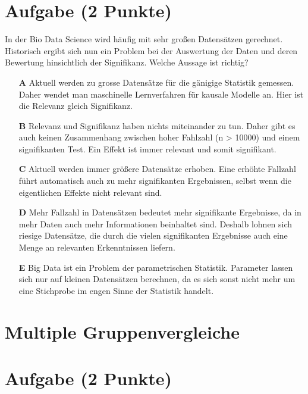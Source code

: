 \documentclass[a4paper, 9pt]{scrartcl}\usepackage[]{graphicx}\usepackage[]{xcolor}
\begin{document}
\section{Aufgabe \hfill (2 Punkte)}



In der Bio Data Science wird häufig mit sehr großen Datensätzen gerechnet. Historisch ergibt sich nun ein Problem bei der Auswertung der Daten und deren Bewertung hinsichtlich der Signifikanz. Welche Aussage ist richtig?





\begin{enumerate}
\item [\textbf{A} \msquare] Aktuell werden zu grosse Datensätze für die gänigige Statistik gemessen. Daher wendet man maschinelle Lernverfahren für kausale Modelle an. Hier ist die Relevanz gleich Signifikanz.
\item [\textbf{B} \msquare] Relevanz und Signifikanz haben nichts miteinander zu tun. Daher gibt es auch keinen Zusammenhang zwischen hoher Fahlzahl (n > 10000) und einem signifikanten Test. Ein Effekt ist immer relevant und somit signifikant.
\item [\textbf{C} \msquare] Aktuell werden immer größere Datensätze erhoben. Eine erhöhte Fallzahl führt automatisch auch zu mehr signifikanten Ergebnissen, selbst wenn die eigentlichen Effekte nicht relevant sind.
\item [\textbf{D} \msquare] Mehr Fallzahl in Datensätzen bedeutet mehr signifikante Ergebnisse, da in mehr Daten auch mehr Informationen beinhaltet sind. Deshalb lohnen sich riesige Datensätze, die durch die vielen signifikanten Ergebnisse auch eine Menge an relevanten Erkenntnissen liefern.
\item [\textbf{E} \msquare] Big Data ist ein Problem der parametrischen Statistik. Parameter lassen sich nur auf kleinen Datensätzen berechnen, da es sich sonst nicht mehr um eine Stichprobe im engen Sinne der Statistik handelt.
\end{enumerate}
\section*{Multiple Gruppenvergleiche}    

\section{Aufgabe \hfill (2 Punkte)}
\end{document}
